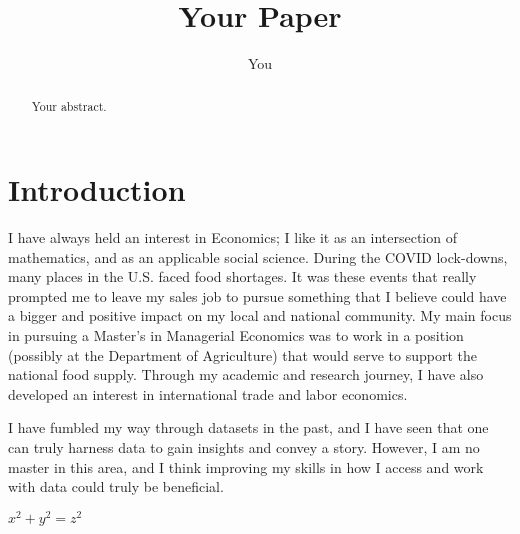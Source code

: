 \documentclass{article}
\title{Your Paper}
\author{You}
\begin{document}
\maketitle

\begin{abstract}
Your abstract.
\end{abstract}

\section{Introduction}

I have always held an interest in Economics; I like it as an intersection of mathematics, and as an applicable social science. During the COVID lock-downs, many places in the U.S. faced food shortages. It was these events that really prompted me to leave my sales job to pursue something that I believe could have a bigger and positive impact on my local and national community. My main focus in pursuing a Master's in Managerial Economics was to work in a position (possibly at the Department of Agriculture) that would serve to support the national food supply. Through my academic and research journey, I have also developed an interest in international trade and labor economics.

I have fumbled my way through datasets in the past, and I have seen that one can truly harness data to gain insights and convey a story. However, I am no master in this area, and I think improving my skills in how I access and work with data could truly be beneficial.

\(x^2 + y^2 = z^2\)





\end{document}

